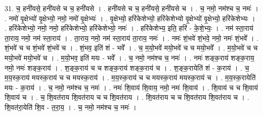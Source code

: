 \documentclass[17pt]{extarticle}
\begin{document}
31. च॒ हनी॑यसे॒ हनी॑यसे च च॒ हनी॑यसे । . हनी॑यसे च च॒ हनी॑यसे॒ हनी॑यसे च । . च॒ नमो॒ नम॑श्च च॒ नमः॑ । . नमो॑ वृ॒क्षेभ्यो॑ वृ॒क्षेभ्यो॒ नमो॒ नमो॑ वृ॒क्षेभ्यः॑ । . वृ॒क्षेभ्यो॒ हरि॑केशेभ्यो॒ हरि॑केशेभ्यो वृ॒क्षेभ्यो॑ वृ॒क्षेभ्यो॒ हरि॑केशेभ्यः । . हरि॑केशेभ्यो॒ नमो॒ नमो॒ हरि॑केशेभ्यो॒ हरि॑केशेभ्यो॒ नमः॑ । . हरि॑केशेभ्य॒ इति॒ हरि॑ - के॒शे॒भ्यः॒ । . नम॑ स्ता॒राय॑ ता॒राय॒ नमो॒ नम॑ स्ता॒राय॑ । . ता॒राय॒ नमो॒ नम॑ स्ता॒राय॑ ता॒राय॒ नमः॑ । . नमः॑ शं॒भवे॑ शं॒भवे॒ नमो॒ नमः॑ शं॒भवे᳚ । . शं॒भवे॑ च च शं॒भवे॑ शं॒भवे॑ च । . शं॒भव॒ इति॑ शं - भवे᳚ । . च॒ म॒यो॒भवे॑ मयो॒भवे॑ च च मयो॒भवे᳚ । . म॒यो॒भवे॑ च च मयो॒भवे॑ मयो॒भवे॑ च । . म॒यो॒भव॒ इति॑ मयः - भवे᳚ । . च॒ नमो॒ नम॑श्च च॒ नमः॑ । . नमः॑ शङ्क॒राय॑ शङ्क॒राय॒ नमो॒ नमः॑ शङ्क॒राय॑ । . श॒ङ्क॒राय॑ च च शङ्क॒राय॑ शङ्क॒राय॑ च । . श॒ङ्क॒रायेति॑ शं - क॒राय॑ । . च॒ म॒य॒स्क॒राय॑ मयस्क॒राय॑ च च मयस्क॒राय॑ । . म॒य॒स्क॒राय॑ च च मयस्क॒राय॑ मयस्क॒राय॑ च । . म॒य॒स्क॒रायेति॑ मयः - क॒राय॑ । . च॒ नमो॒ नम॑श्च च॒ नमः॑ । . नमः॑ शि॒वाय॑ शि॒वाय॒ नमो॒ नमः॑ शि॒वाय॑ । . शि॒वाय॑ च च शि॒वाय॑ शि॒वाय॑ च । . च॒ शि॒वत॑राय शि॒वत॑राय च च शि॒वत॑राय । . शि॒वत॑राय च च शि॒वत॑राय शि॒वत॑राय च । . शि॒वत॑रा॒येति॑ शि॒व - त॒रा॒य॒ । . च॒ नमो॒ नम॑श्च च॒ नमः॑ । \newline
\end{document}
